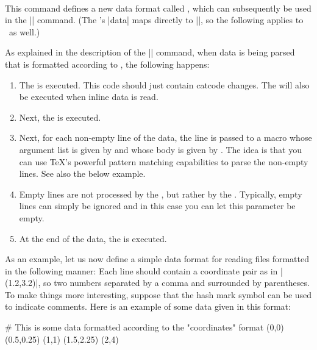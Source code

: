 \begin{command}{\pgfdeclaredataformat{}\\}
  This command defines a new data format called ,
  which can subsequently be used in the |\pgfdata| command. (The
  \tikzname's |data| maps directly to |\pgfdata|, so the following
  applies to \tikzname\ as well.)

  As explained in the description of the |\pgfdata| command, when data
  is being parsed that is formatted according to ,
  the following happens:
  \begin{enumerate}
  \item The  is executed. This code should just
    contain catcode changes. The  will also be
    executed when inline data is read.
  \item Next, the  is executed.
  \item Next, for each non-empty line of the data, the line is passed
    to a macro whose argument list is given by  and whose body is given by . The idea
    is that you can use \TeX's powerful pattern matching capabilities
    to parse the non-empty lines. See also the below example.
  \item Empty lines are not processed by the , but
    rather by the . Typically, empty lines can
    simply be ignored and in this case you can let this parameter be
    empty.
  \item At the end of the data, the  is executed.
  \end{enumerate}

  As an example, let us now define a simple data format for reading
  files formatted in the following manner: Each line should contain a
  coordinate pair as in |(1.2,3.2)|, so two numbers separated by a
  comma and surrounded by parentheses. To make things more
  interesting, suppose that the hash mark symbol can be used to
  indicate comments. Here is an example of some data given in this
  format:
\begin{codeexample}
# This is some data formatted according to the "coordinates" format
(0,0)
(0.5,0.25)
(1,1)
(1.5,2.25)
(2,4)
\end{codeexample}


\end{command}
